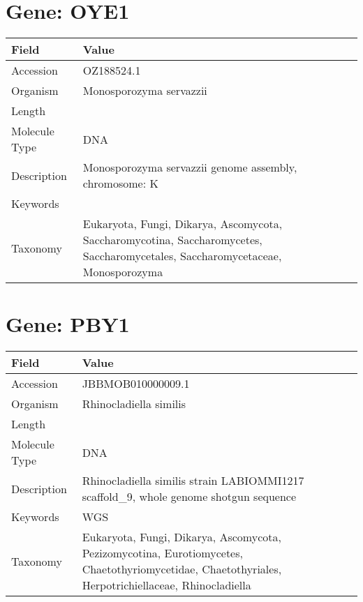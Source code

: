 \documentclass[10pt]{article}
\begin{document}
\section{Gene: OYE1}
{\footnotesize
\begin{longtable}{>{\raggedright\arraybackslash}p{4.5cm} >{\raggedright\arraybackslash}p{11.5cm}}
\textbf{Field} & \textbf{Value} \\
\hline
Accession & OZ188524.1 \\
Organism & Monosporozyma servazzii \\
Length & 1040374 \\
Molecule Type & DNA \\
Description & Monosporozyma servazzii genome assembly, chromosome: K \\
Keywords &  \\
Taxonomy & Eukaryota, Fungi, Dikarya, Ascomycota, Saccharomycotina, Saccharomycetes, Saccharomycetales, Saccharomycetaceae, Monosporozyma \\
\end{longtable}
}

\vspace{1em}
\section{Gene: PBY1}
{\footnotesize
\begin{longtable}{>{\raggedright\arraybackslash}p{4.5cm} >{\raggedright\arraybackslash}p{11.5cm}}
\textbf{Field} & \textbf{Value} \\
\hline
Accession & JBBMOB010000009.1 \\
Organism & Rhinocladiella similis \\
Length & 1267032 \\
Molecule Type & DNA \\
Description & Rhinocladiella similis strain LABIOMMI1217 scaffold\_9, whole genome shotgun sequence \\
Keywords & WGS \\
Taxonomy & Eukaryota, Fungi, Dikarya, Ascomycota, Pezizomycotina, Eurotiomycetes, Chaetothyriomycetidae, Chaetothyriales, Herpotrichiellaceae, Rhinocladiella \\
\end{longtable}
}

\vspace{1em}
\end{document}
